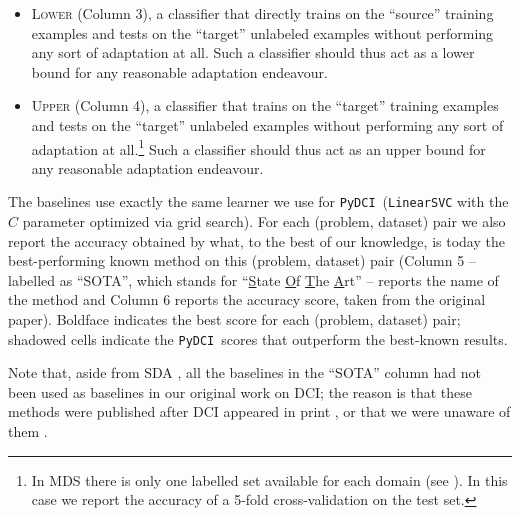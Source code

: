 \documentclass{article}
\newcommand{\pydci}{\texttt{PyDCI}}
\begin{document}
\begin{itemize}

\item \textsc{Lower} (Column 3), a classifier that directly trains on
  the ``source'' training examples and tests on the ``target''
  unlabeled examples without performing any sort of adaptation at
  all. Such a classifier should thus act as a lower bound for any
  reasonable adaptation endeavour.

\item \textsc{Upper} (Column 4), a classifier that trains on the
  ``target'' training examples and tests on the ``target'' unlabeled
  examples without performing any sort of adaptation at
  all.\footnote{In MDS there is only one labelled set available for
  each domain (see \citep{Blitzer:2007gf}). In this case we report the
  accuracy of a 5-fold cross-validation on the test set.} Such a
  classifier should thus act as an upper bound for any reasonable
  adaptation endeavour.

\end{itemize}

\noindent The baselines use exactly the same learner we use for
\pydci\ (\texttt{LinearSVC} with the $C$ parameter optimized via grid
search). For each (problem, dataset) pair we also report the accuracy
obtained by what, to the best of our knowledge, is today the
best-performing known method on this (problem, dataset) pair (Column 5
-- labelled as ``SOTA'', which stands for ``\underline{S}tate
\underline{O}f \underline{T}he \underline{A}rt'' -- reports the name
of the method and Column 6 reports the accuracy score, taken from the
original paper).  Boldface indicates the best score for each (problem,
dataset) pair; shadowed cells indicate the \pydci\ scores that
outperform the best-known results.

Note that, aside from SDA \citep{glorot2011domain}, all the baselines
in the ``SOTA'' column had not been used as baselines in our original
work on DCI; the reason is that these methods were published after DCI
appeared in print
\citep{ganin2016domain,Li:2017kg,xu2017cross,zhou2016cross}, or that
we were unaware of them \citep{Yang:2015nb}.
\end{document}
